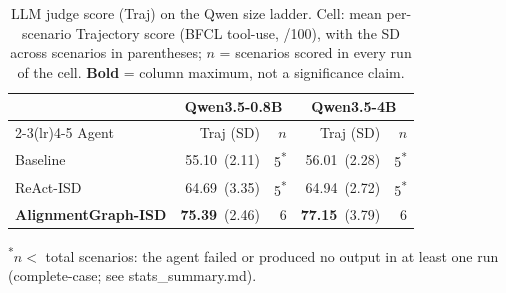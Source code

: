 
\begin{table}[t]
  \caption{LLM judge score (Traj) on the Qwen size ladder. Cell: mean per-scenario Trajectory score (BFCL tool-use, /100), with the SD across scenarios in parentheses; $n$ = scenarios scored in every run of the cell. \textbf{Bold} = column maximum, not a significance claim.}
  \label{tab:rq1-ladder-traj}
  \small
  \begin{tabular}{@{}lr@{\hskip 3pt}rr@{\hskip 3pt}r@{}}
    \toprule
    & \multicolumn{2}{c}{Qwen3.5-0.8B} & \multicolumn{2}{c}{Qwen3.5-4B} \\
    \cmidrule(lr){2-3}\cmidrule(lr){4-5}
    Agent & Traj {\scriptsize(SD)} & $n$ & Traj {\scriptsize(SD)} & $n$ \\
    \midrule
    Baseline & 55.10~{\scriptsize(2.11)} & 5\textsuperscript{*} & 56.01~{\scriptsize(2.28)} & 5\textsuperscript{*} \\
    ReAct-ISD & 64.69~{\scriptsize(3.35)} & 5\textsuperscript{*} & 64.94~{\scriptsize(2.72)} & 5\textsuperscript{*} \\
    \textbf{AlignmentGraph-ISD} & \textbf{75.39}~{\scriptsize(2.46)} & 6 & \textbf{77.15}~{\scriptsize(3.79)} & 6 \\
    \bottomrule
  \end{tabular}
  \par\smallskip\footnotesize\textsuperscript{*}$n<$ total scenarios: the agent failed or produced no output in at least one run (complete-case; see stats\_summary.md).
\end{table}
